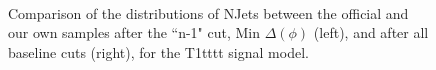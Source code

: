 \begin{figure}
        \centering
        \hspace{-1 cm}
        ~ %
        \caption{Comparison of the distributions of NJets between the official and our own samples after the ``n-1" cut, Min $\Delta(\phi)$ (left), and after all baseline cuts (right), for the T1tttt signal model.}\label{fig:animals}
\end{figure}        
        
